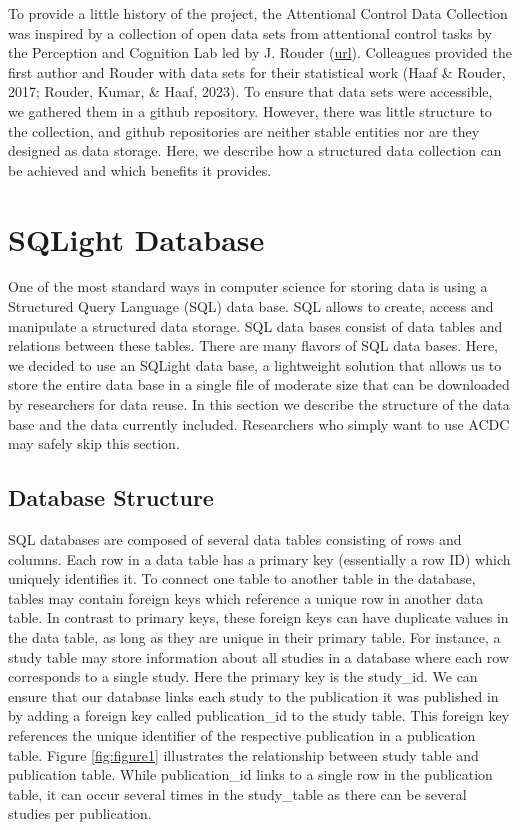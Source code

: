 \documentclass[
  man,floatsintext]{apa6}
\begin{document}
To provide a little history of the project, the Attentional Control Data Collection was inspired by a collection of open data sets from attentional control tasks by the Perception and Cognition Lab led by J. Rouder (\href{https://github.com/PerceptionCognitionLab/data0}{url}). Colleagues provided the first author and Rouder with data sets for their statistical work (Haaf \& Rouder, 2017; Rouder, Kumar, \& Haaf, 2023). To ensure that data sets were accessible, we gathered them in a github repository. However, there was little structure to the collection, and github repositories are neither stable entities nor are they designed as data storage. Here, we describe how a structured data collection can be achieved and which benefits it provides.

\hypertarget{sqlight-database}{%
\section{SQLight Database}\label{sqlight-database}}

One of the most standard ways in computer science for storing data is using a Structured Query Language (SQL) data base. SQL allows to create, access and manipulate a structured data storage. SQL data bases consist of data tables and relations between these tables. There are many flavors of SQL data bases. Here, we decided to use an SQLight data base, a lightweight solution that allows us to store the entire data base in a single file of moderate size that can be downloaded by researchers for data reuse. In this section we describe the structure of the data base and the data currently included. Researchers who simply want to use ACDC may safely skip this section.

\hypertarget{database-structure}{%
\subsection{Database Structure}\label{database-structure}}

SQL databases are composed of several data tables consisting of rows and columns. Each row in a data table has a primary key (essentially a row ID) which uniquely identifies it. To connect one table to another table in the database, tables may contain foreign keys which reference a unique row in another data table. In contrast to primary keys, these foreign keys can have duplicate values in the data table, as long as they are unique in their primary table. For instance, a study table may store information about all studies in a database where each row corresponds to a single study. Here the primary key is the study\_id. We can ensure that our database links each study to the publication it was published in by adding a foreign key called publication\_id to the study table. This foreign key references the unique identifier of the respective publication in a publication table. Figure \ref{fig:figure1} illustrates the relationship between study table and publication table. While publication\_id links to a single row in the publication table, it can occur several times in the study\_table as there can be several studies per publication.
\end{document}
